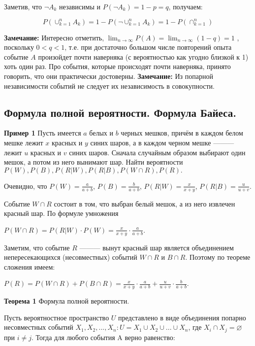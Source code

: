 \documentclass{article}
\begin{document}
Заметив, что \(\lnot A_k\) независимы и \(P(\lnot A_k) = 1 - p = q\), получаем:

\[P(\cup_{k=1}^{n} A_k) = 1 - P(\lnot \cup_{k=1}^{n} A_k) = 1 - P(\cap_{k=1}^{n} )\]

\textbf{Замечание:} Интересно отметить, \( \lim_{n \to \infty} P(A) = \lim_{n \to \infty}(1 - q)= 1\) , поскольку \(0<q<1\), т.е. при достаточно большом числе повторений опыта событие $A$ произойдет почти наверняка (с вероятностью как угодно близкой к 1) хоть один раз. Про события, которые происходят почти наверняка, принято говорить, что они практически достоверны.
\textbf{Замечание:} Из попарной независимости событий не следует их независимость в совокупности. 



\subsection{Формула полной вероятности. Формула Байеса.}

\textbf{Пример 1}
Пусть имеется $a$ белых и $b$ черных мешков, причём в каждом белом мешке лежит $x$ красных и $y$ синих шаров, 
а в каждом черном мешке ——— лежит $u$ красных и $v$ синих шаров. 
Сначала случайным образом выбирают один мешок, 
а потом из него вынимают шар. Найти вероятности \(P(W), P(B), P(R|W), P(R|B), P(W \cap R), P(R).\)

Очевидно, что \(P(W) = \frac{a}{a + b}\), \(P(B) = \frac{b}{a + b}\), \(P(R|W) = \frac{x}{x + y}\), \(P(R|B) = \frac{u}{u + v}\). 

Событие \(W \cap R\) состоит в том, что выбран белый мешок, а из него извлечен красный шар. По формуле умножения

\(P(W \cap R) = P(R|W) \cdot P(W) = \frac{x}{x + y} \cdot \frac{a}{a + b}\).

Заметим, что событие $R$ ——— вынут красный шар является объединением непересекающихся (несовместных) событий \(W \cap R\) и \(B \cap R\).
Поэтому по теореме сложения имеем:

\(P(R) = P(W \cap R) + P(B \cap R) = \frac{x}{x + y} \cdot \frac{a}{a + b} + \frac{u}{u + v} \cdot \frac{b}{a + b}\).


\textbf{Теорема 1} Формула полной вероятности.

Пусть вероятностное пространство $U$ представлено в виде объединения попарно несовместных событий \(X_1, X_2,..., X_n: U = X_1 \cup X_2 \cup ... \cup X_n\), где \(X_i \cap X_j = \varnothing\) при \(i \not = j\). 
Тогда для любого события A верно равенство:
\end{document}
